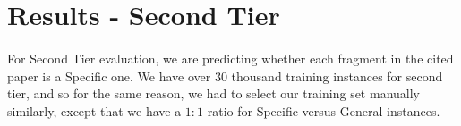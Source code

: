 \section{Results - Second Tier}
\paragraph{}
For Second Tier evaluation, we are predicting whether each fragment in the cited paper is a Specific one. We have over 30 thousand training instances for second tier, and so for the same reason, we had to select our training set manually similarly, except that we have a $1:1$ ratio for Specific versus General instances.
